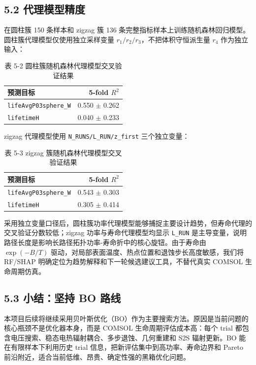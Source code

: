 \documentclass[
  a4paper,
]{ctexart}
\begin{document}
\subsection{5.2
代理模型精度}\label{ux4ee3ux7406ux6a21ux578bux7cbeux5ea6}

在圆柱簇 150 条样本和 zigzag 簇 136 条完整指标样本上训练随机森林回归模型。圆柱簇代理模型仅使用独立采样变量
\(r_1/r_2/r_3\)，不把体积守恒派生量 \(r_4\) 作为独立输入：


\begin{table}[H]
\centering
\caption*{表 5-2 圆柱簇随机森林代理模型交叉验证结果}
\small
\begin{tabular}{lr}
\toprule
预测目标 & 5-fold $R^2$ \\
\midrule
\texttt{lifeAvgP03sphere\_W} & 0.550 $\pm$ 0.262 \\
\texttt{lifetimeH} & 0.040 $\pm$ 0.233 \\
\bottomrule
\end{tabular}
\end{table}


zigzag 代理模型使用 \texttt{N\_RUNS/L\_RUN/z\_first} 三个独立变量：


\begin{table}[H]
\centering
\caption*{表 5-3 zigzag 簇随机森林代理模型交叉验证结果}
\small
\begin{tabular}{lr}
\toprule
预测目标 & 5-fold $R^2$ \\
\midrule
\texttt{lifeAvgP03sphere\_W} & 0.543 $\pm$ 0.303 \\
\texttt{lifetimeH} & 0.305 $\pm$ 0.414 \\
\bottomrule
\end{tabular}
\end{table}


采用独立变量口径后，圆柱簇功率代理模型能够捕捉主要设计趋势，但寿命代理的交叉验证分数较低；zigzag 功率与寿命代理模型均显示 \texttt{L\_RUN} 是主导变量，说明路径长度是影响长路径拓扑功率-寿命折中的核心旋钮。由于寿命由
\(\exp(-B/T)\)
驱动，对局部表面温度、热点位置和退蚀步长高度敏感，我们将
RF/SHAP 明确定位为趋势解释和下一轮候选建议工具，不替代真实 COMSOL
生命周期仿真。

\subsection{5.3 小结：坚持 BO
路线}\label{ux5c0fux7ed3ux575aux6301-bo-ux8defux7ebf}

本项目后续将继续采用贝叶斯优化（BO）作为主要搜索方法。原因是当前问题的核心瓶颈不是优化器本身，而是
COMSOL 生命周期评估成本高：每个 trial
都包含电压搜索、稳态电热辐射耦合、多步退蚀、几何重建和 S2S 辐射更新。BO
能在有限样本下利用历史 trial 信息，把新评估集中到高功率、寿命边界和
Pareto 前沿附近，适合当前低维、昂贵、确定性强的黑箱优化问题。
\end{document}
